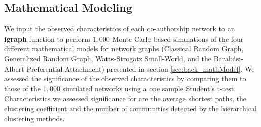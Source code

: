 \subsection{Mathematical Modeling}
We input the observed characteristics of each co-authorship network to an \textbf{igraph} function to perform $1,000$ Monte-Carlo based simulations of the four different mathematical models for network graphs (Classical Random Graph, Generalized Random Graph, Watts-Strogatz Small-World, and the Barab\'asi-Albert Preferential Attachment) presented in section \ref{sec:back_mathModel}. We assessed the significance of the observed characteristics by comparing them to those of the $1,000$ simulated networks using a one sample Student’s t-test. Characteristics we assessed significance for are the average shortest paths, the clustering coefficient and the number of communities detected by the hierarchical clustering methods.

